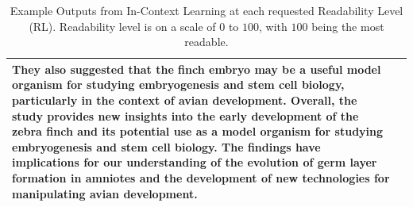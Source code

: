 \begin{table}[]
\begin{tabular}{l|p{}}
They also suggested that the finch embryo may be a useful model organism for studying embryogenesis and stem cell biology, particularly in the context of avian development.  Overall, the study provides new insights into the early development of the zebra finch and its potential use as a model organism for studying embryogenesis and stem cell biology. The findings have implications for our understanding of the evolution of germ layer formation in amniotes and the development of new technologies for manipulating avian development. \\ \hline
\end{tabular}
\caption[Example Outputs from In-Context Learning at each requested Readability Level.]{Example Outputs from In-Context Learning at each requested Readability Level (RL). Readability level is on a scale of $0$ to $100$, with $100$ being the most readable.}\label{tab:icl-ex-outputs}
\end{table}

